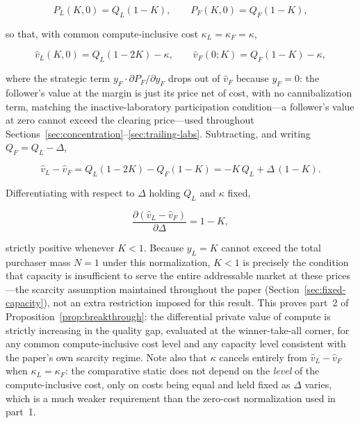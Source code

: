 \documentclass[11pt]{article}
\begin{document}
\begin{equation}P_L(K,0)=Q_L(1-K),\qquad P_F(K,0)=Q_F(1-K),\end{equation}

so that, with common compute-inclusive cost $\kappa_L=\kappa_F=\kappa$,

\begin{equation}\widehat v_L(K,0)=Q_L(1-2K)-\kappa,\qquad \widehat v_F(0;K)=Q_F(1-K)-\kappa,\end{equation}

where the strategic term $y_F\cdot\partial P_F/\partial y_F$ drops out of $\widehat v_F$ because $y_F=0$: the follower's value at the margin is just its price net of cost, with no cannibalization term, matching the inactive-laboratory participation condition---a follower's value at zero cannot exceed the clearing price---used throughout Sections~\ref{sec:concentration}--\ref{sec:trailing-labs}. Subtracting, and writing $Q_F=Q_L-\Delta$,

\begin{equation}\widehat v_L-\widehat v_F=Q_L(1-2K)-Q_F(1-K)=-K\,Q_L+\Delta\,(1-K).\end{equation}

Differentiating with respect to $\Delta$ holding $Q_L$ and $\kappa$ fixed,

\begin{equation}\frac{\partial(\widehat v_L-\widehat v_F)}{\partial\Delta}=1-K,\end{equation}

strictly positive whenever $K<1$. Because $y_L=K$ cannot exceed the total purchaser mass $N=1$ under this normalization, $K<1$ is precisely the condition that capacity is insufficient to serve the entire addressable market at these prices---the scarcity assumption maintained throughout the paper (Section~\ref{sec:fixed-capacity}), not an extra restriction imposed for this result. This proves part~2 of Proposition~\ref{prop:breakthrough}: the differential private value of compute is strictly increasing in the quality gap, evaluated at the winner-take-all corner, for any common compute-inclusive cost level and any capacity level consistent with the paper's own scarcity regime. Note also that $\kappa$ cancels entirely from $\widehat v_L-\widehat v_F$ when $\kappa_L=\kappa_F$: the comparative static does not depend on the \emph{level} of the compute-inclusive cost, only on costs being equal and held fixed as $\Delta$ varies, which is a much weaker requirement than the zero-cost normalization used in part~1.
\end{document}
